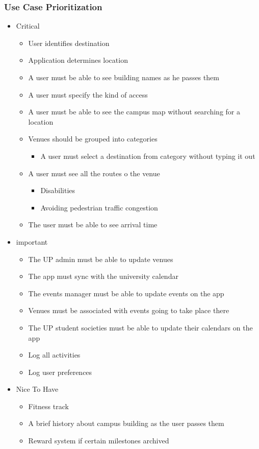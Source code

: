 \documentclass[12pt, a4paper]{article}
\begin{document}
		\subsubsection{Use Case Prioritization}
			\begin{itemize}
				\item Critical
					\begin{itemize}
						\item User identifies destination
						\item Application determines location
						\item A user must be able to see building names as he passes them
						\item A user must specify  the kind of access
						\item A user must be able to see the campus map without searching for a location
						\item Venues should be grouped into categories
							\begin{itemize}
							\item A user must select a destination from category without typing it out
							\end{itemize}
						\item A user must see all the routes o the venue
							\begin{itemize}
								\item Disabilities
								\item Avoiding pedestrian traffic congestion
							\end{itemize}
						\item The user must be able to see arrival time
					\end{itemize}
				\item important
					\begin{itemize}
						\item The UP admin must be able to update venues
						\item The app must sync with the university calendar
						\item The events manager must be able to update events on the app
						\item Venues must be associated with events going to take place there
 						\item The UP student societies must be able to update their calendars on the app
						\item Log all activities
						\item Log user preferences
					\end{itemize}
				\item Nice To Have
					\begin{itemize}
						\item Fitness track
						\item A brief history about campus building as the user passes them
						\item Reward system if certain milestones archived
						
					\end{itemize}

			\end{itemize}
		
\end{document}
